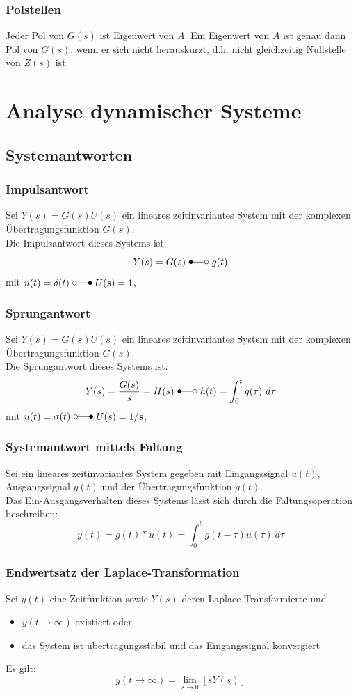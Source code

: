 \documentclass[10pt,a4paper]{article}
\begin{document}
\subsubsection{Polstellen}
Jeder Pol von $G(s)$ ist Eigenwert von $A$. Ein Eigenwert von $A$ ist genau dann Pol von $G(s)$, wenn er sich nicht herauskürzt, d.h. nicht gleichzeitig Nullstelle von $Z(s)$ ist.

\section{Analyse dynamischer Systeme}
\subsection{Systemantworten}
\subsubsection{Impulsantwort}
Sei $Y(s) = G(s) U(s)$ ein lineares zeitinvariantes System mit der komplexen Übertragungsfunktion $G(s)$. \\
Die Impulsantwort dieses Systems ist:
$$
	Y(s) = G(s) ~\Laplace ~g(t)
$$
mit $u(t) = \delta(t) ~\laplace ~U(s) = 1$,

\subsubsection{Sprungantwort}
Sei $Y(s) = G(s) U(s)$ ein lineares zeitinvariantes System mit der komplexen Übertragungsfunktion $G(s)$. \\
Die Sprungantwort dieses Systems ist:
$$
	Y(s) = \frac{G(s)} s = H(s) ~\Laplace ~h(t) = \int_0^t g(\tau) ~d\tau
$$
mit $u(t) = \sigma(t) ~\laplace ~U(s) = 1/s$,

\subsubsection{Systemantwort mittels Faltung}
Sei ein lineares zeitinvariantes System gegeben mit Eingangssignal $u(t)$, Ausgangssignal $y(t)$ und der Übertragungsfunktion $g(t)$. \\
Das Ein-Ausgangsverhalten dieses Systems lässt sich durch die Faltungsoperation beschreiben:
$$
	y(t) = g(t) * u(t) = \int_0^t g(t - \tau) u(\tau) ~d \tau
$$

\subsubsection{Endwertsatz der Laplace-Transformation}
Sei $y(t)$ eine Zeitfunktion sowie $Y(s)$ deren Laplace-Transformierte und
\begin{itemize}
	\item $y(t → ∞)$ existiert oder
	\item das System ist übertragungsstabil und das Eingangssignal konvergiert
\end{itemize}
Es gilt:
$$
	y(t → ∞) = \lim_{s → 0} [sY(s)]
$$
\end{document}
